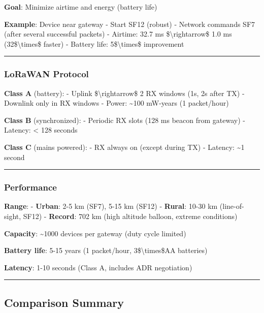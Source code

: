 \textbf{Goal}: Minimize airtime and energy (battery life)

\textbf{Example}: Device near gateway - Start SF12 (robust) - Network
commands SF7 (after several successful packets) - Airtime: 32.7 ms
\$\textbackslash rightarrow\$ 1.0 ms (32\$\textbackslash times\$ faster)
- Battery life: 5\$\textbackslash times\$ improvement

\begin{center}\rule{0.5\linewidth}{0.5pt}\end{center}

\subsubsection{LoRaWAN Protocol}\label{lorawan-protocol}

\textbf{Class A} (battery): - Uplink \$\textbackslash rightarrow\$ 2 RX
windows (1s, 2s after TX) - Downlink only in RX windows - Power:
\textasciitilde100 mW-years (1 packet/hour)

\textbf{Class B} (synchronized): - Periodic RX slots (128 ms beacon from
gateway) - Latency: \textless{} 128 seconds

\textbf{Class C} (mains powered): - RX always on (except during TX) -
Latency: \textasciitilde1 second

\begin{center}\rule{0.5\linewidth}{0.5pt}\end{center}

\subsubsection{Performance}\label{performance-5}

\textbf{Range}: - \textbf{Urban}: 2-5 km (SF7), 5-15 km (SF12) -
\textbf{Rural}: 10-30 km (line-of-sight, SF12) - \textbf{Record}: 702 km
(high altitude balloon, extreme conditions)

\textbf{Capacity}: \textasciitilde1000 devices per gateway (duty cycle
limited)

\textbf{Battery life}: 5-15 years (1 packet/hour,
3\$\textbackslash times\$AA batteries)

\textbf{Latency}: 1-10 seconds (Class A, includes ADR negotiation)

\begin{center}\rule{0.5\linewidth}{0.5pt}\end{center}

\subsection{Comparison Summary}\label{comparison-summary}

